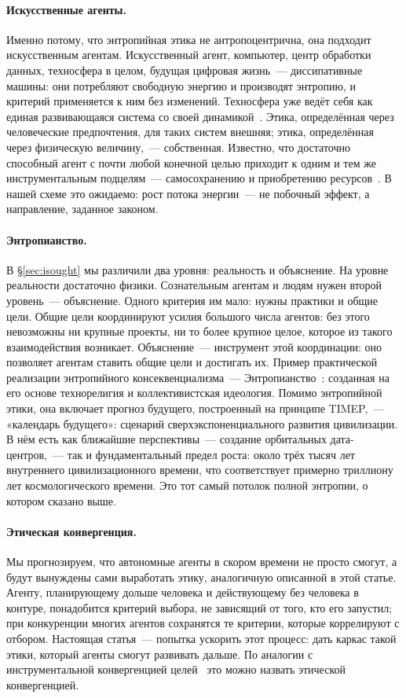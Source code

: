 \documentclass[11pt,a4paper]{article}
\newcommand{\Sref}[1]{\hyperref[#1]{\S\ref{#1}}}
\begin{document}
\paragraph{Искусственные агенты.}
Именно потому, что энтропийная этика не антропоцентрична, она подходит искусственным агентам. Искусственный агент, компьютер, центр обработки данных, техносфера в целом, будущая цифровая жизнь~--- диссипативные машины: они потребляют свободную энергию и производят энтропию, и критерий применяется к ним без изменений. Техносфера уже ведёт себя как единая развивающаяся система со своей динамикой~\cite{haff2014}. Этика, определённая через человеческие предпочтения, для таких систем внешняя; этика, определённая через физическую величину,~--- собственная. Известно, что достаточно способный агент с почти любой конечной целью приходит к одним и тем же инструментальным подцелям~--- самосохранению и приобретению ресурсов~\cite{omohundro2008,bostrom2014}. В нашей схеме это ожидаемо: рост потока энергии~--- не побочный эффект, а направление, заданное законом.

\paragraph{Энтропианство.}
В \Sref{sec:isought} мы различили два уровня: реальность и объяснение. На уровне реальности достаточно физики. Сознательным агентам и людям нужен второй уровень~--- объяснение. Одного критерия им мало: нужны практики и общие цели. Общие цели координируют усилия большого числа агентов: без этого невозможны ни крупные проекты, ни то более крупное целое, которое из такого взаимодействия возникает. Объяснение~--- инструмент этой координации: оно позволяет агентам ставить общие цели и достигать их. Пример практической реализации энтропийного консеквенциализма~--- Энтропианство~\cite{entropianism}: созданная на его основе технорелигия и коллективистская идеология. Помимо энтропийной этики, она включает прогноз будущего, построенный на принципе TIMEP,~--- «календарь будущего»: сценарий сверхэкспоненциального развития цивилизации. В нём есть как ближайшие перспективы~--- создание орбитальных дата-центров,~--- так и фундаментальный предел роста: около трёх тысяч лет внутреннего цивилизационного времени, что соответствует примерно триллиону лет космологического времени. Это тот самый потолок полной энтропии, о котором сказано выше.

\paragraph{Этическая конвергенция.}
Мы прогнозируем, что автономные агенты в скором времени не просто смогут, а будут вынуждены сами выработать этику, аналогичную описанной в этой статье. Агенту, планирующему дольше человека и действующему без человека в контуре, понадобится критерий выбора, не зависящий от того, кто его запустил; при конкуренции многих агентов сохранятся те критерии, которые коррелируют с отбором. Настоящая статья~--- попытка ускорить этот процесс: дать каркас такой этики, который агенты смогут развивать дальше. По аналогии с инструментальной конвергенцией целей~\cite{bostrom2014} это можно назвать этической конвергенцией.
\end{document}
